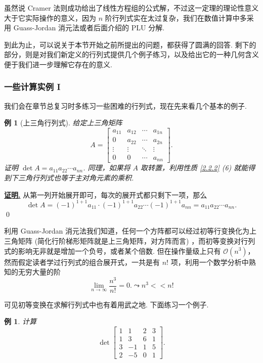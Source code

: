 \documentclass[10pt,openany]{article}
\theoremstyle{thmstyle} %
\theoremstyle{defstyle} %
\theoremstyle{prostyle} %
\theoremstyle{exastyle}
\newtheorem{example}[theorem]{例}
\theoremstyle{remstyle}
\renewenvironment{proof}[1][证明]{\par\underline{\textbf{#1.}} \;\fangsong}{\qed\par}
\begin{document}
虽然说 Cramer 法则成功给出了线性方程组的公式解，不过这一定理的理论性意义大于它实际操作的意义，因为 \( n \) 阶行列式实在太过复杂，我们在数值计算中多采用 Guass-Jordan 消元法或者后面介绍的 PLU 分解.

到此为止，可以说关于本节开始之前所提出的问题，都获得了圆满的回答. 剩下的部分，则是对我们新定义的行列式提供几个例子练习，以及给出它的一种几何含义便于我们进一步理解它存在的意义.

\subsubsection{一些计算实例 I}

我们会在章节总复习时多练习一些困难的行列式，现在先来看几个基本的例子.

\begin{example}[上三角行列式]
	给定上三角矩阵
	\[ A= 
	\begin{bmatrix}
		a_{11} & a_{12} & \cdots & a_{1n} \\
		0      & a_{22} & \cdots & a_{2n} \\
		\vdots & \vdots & \ddots & \vdots \\
		0      & 0      & \cdots & a_{nn}
	\end{bmatrix}. 
	\]
	证明 \( \det A=a_{11}a_{22}\cdots a_{nn} \). 同理，如果将 \( A \) 取转置，利用性质 \ref{2.2.2} (6) 就能得到下三角行列式也等于主对角元素的乘积.
\end{example}

\begin{proof}
	从第一列开始展开即可，每次的展开式都只剩下一项，那么
	\[ \det A= (-1)^{1+1}a_{11} \cdot (-1)^{1+1}a_{22} \cdots (-1)^{1+1} a_{nn}=a_{11}a_{22}\cdots a_{nn}. \]
\end{proof}

利用 Guass-Jordan 消元法我们知道，任何一个方阵都可以经过初等行变换化为上三角矩阵 (简化行阶梯形矩阵就是上三角矩阵，对方阵而言) ，而初等变换对行列式的影响无非就是增加一个负号，或者某个倍数. 但在操作量级上只有 \( \mathcal{O}(n^3) \)，然而假定读者学过行列式的组合展开式，一共是有 \( n! \) 项，利用一个数学分析中熟知的无穷大量的阶
\[ \lim\limits_{n \to \infty} \frac{n^3}{n!}=0. \leadsto n^3<<n!  \]

可见初等变换在求解行列式中也有着用武之地. 下面练习一个例子.

\begin{example}
	计算 \[ \det \begin{bmatrix}
		1 & 1 & 2 & 3 \\
		1 & 3 & 6 & 1 \\
		3 & -1 & 1 & 5 \\
		2 & -5 & 0 & 1
	\end{bmatrix}. \]
\end{example}
\end{document}
